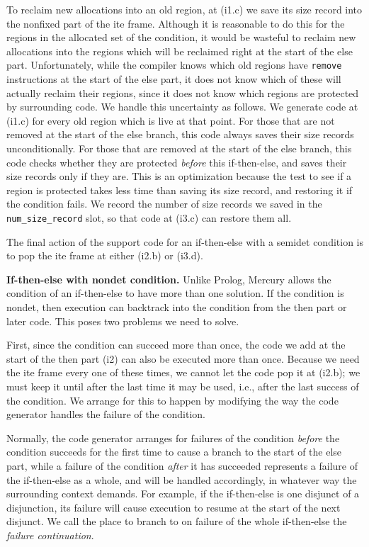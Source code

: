 \documentclass{tlp}
\newcommand{\code}[1]{{\tt#1}}
\begin{document}
To reclaim new allocations into an old region,
at (i1.c) we save its size record into the nonfixed part of the ite frame.
Although it is reasonable to do this
for the regions in the allocated set of the condition,
it would be wasteful to reclaim new allocations into the regions
which will be reclaimed right at the start of the else part.
Unfortunately, while the compiler knows which old regions
have \code{remove} instructions at the start of the else part,
it does not know which of these will actually reclaim their regions,
since it does not know which regions are protected by surrounding code.
We handle this uncertainty as follows.
We generate code at (i1.c) for every old region which is live at that point.
For those that are not removed at the start of the else branch,
this code always saves their size records unconditionally.
For those that are removed at the start of the else branch,
this code checks whether they are protected \emph{before} this if-then-else,
and saves their size records only if they are.
This is an optimization
because the test to see if a region is protected
takes less time than
saving its size record, and restoring it if the condition fails.
We record the number of size records
we saved in the \code{num\_size\_record} slot,
so that code at (i3.c) can restore them all.

The final action of the support code
for an if-then-else with a semidet condition
is to pop the ite frame at either (i2.b) or (i3.d).

\noindent\textbf{If-then-else with nondet condition.}
Unlike Prolog,
Mercury allows the condition of an if-then-else to have more than one solution.
If the condition is nondet,
then execution can backtrack into the condition
from the then part or later code.
This poses two problems we need to solve.

First,
since the condition can succeed more than once,
the code we add at the start of the then part (i2)
can also be executed more than once.
Because we need the ite frame every one of these times,
we cannot let the code pop it at (i2.b);
we must keep it until after the last time it may be used,
i.e., after the last success of the condition.
We arrange for this to happen
by modifying the way the code generator handles the failure of the condition.

Normally, the code generator arranges for failures of the condition
\emph{before} the condition succeeds for the first time
to cause a branch to the start of the else part,
while a failure of the condition \emph{after} it has succeeded
represents a failure of the if-then-else as a whole,
and will be handled accordingly,
in whatever way the surrounding context demands.
For example, if the if-then-else is one disjunct of a disjunction,
its failure will cause execution to resume at the start of the next disjunct.
We call the place to branch to on failure of the whole if-then-else
the \emph{failure continuation}.
\end{document}
